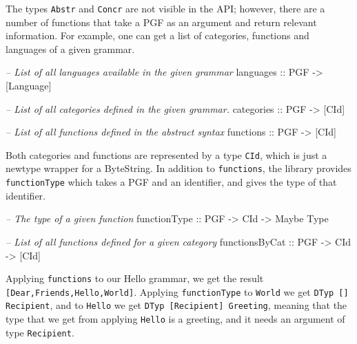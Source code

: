 \documentclass[]{article}
\newenvironment{Shaded}{\begin{snugshade}}{\end{snugshade}}
\newcommand{\DataTypeTok}[1]{\textcolor[rgb]{0.13,0.29,0.53}{{#1}}}
\newcommand{\CommentTok}[1]{\textcolor[rgb]{0.56,0.35,0.01}{\textit{{#1}}}}
\newcommand{\OtherTok}[1]{\textcolor[rgb]{0.56,0.35,0.01}{{#1}}}
\newcommand{\NormalTok}[1]{{#1}}
\begin{document}
The types \texttt{Abstr} and \texttt{Concr} are not visible in the API;
however, there are a number of functions that take a PGF as an argument
and return relevant information. For example, one can get a list of
categories, functions and languages of a given grammar.

\begin{Shaded}
\begin{Highlighting}[]
\CommentTok{-- List of all languages available in the given grammar}
\OtherTok{languages ::} \DataTypeTok{PGF} \OtherTok{->} \NormalTok{[}\DataTypeTok{Language}\NormalTok{]}

\CommentTok{-- List of all categories defined in the given grammar.}
\OtherTok{categories ::} \DataTypeTok{PGF} \OtherTok{->} \NormalTok{[}\DataTypeTok{CId}\NormalTok{]}

\CommentTok{-- List of all functions defined in the abstract syntax}
\OtherTok{functions ::} \DataTypeTok{PGF} \OtherTok{->} \NormalTok{[}\DataTypeTok{CId}\NormalTok{]}
\end{Highlighting}
\end{Shaded}

Both categories and functions are represented by a type \texttt{CId},
which is just a newtype wrapper for a ByteString. In addition to
\texttt{functions}, the library provides \texttt{functionType} which
takes a PGF and an identifier, and gives the type of that identifier.

\begin{Shaded}
\begin{Highlighting}[]
\CommentTok{-- The type of a given function}
\OtherTok{functionType ::} \DataTypeTok{PGF} \OtherTok{->} \DataTypeTok{CId} \OtherTok{->} \DataTypeTok{Maybe} \DataTypeTok{Type}

\CommentTok{-- List of all functions defined for a given category}
\OtherTok{functionsByCat ::} \DataTypeTok{PGF} \OtherTok{->} \DataTypeTok{CId} \OtherTok{->} \NormalTok{[}\DataTypeTok{CId}\NormalTok{]}
\end{Highlighting}
\end{Shaded}

Applying \texttt{functions} to our Hello grammar, we get the result
\texttt{{[}Dear,Friends,Hello,World{]}}. Applying \texttt{functionType}
to \texttt{World} we get \texttt{DTyp {[}{]} Recipient}, and to
\texttt{Hello} we get \texttt{DTyp {[}Recipient{]} Greeting}, meaning
that the type that we get from applying \texttt{Hello} is a greeting,
and it needs an argument of type \texttt{Recipient}.
\end{document}
